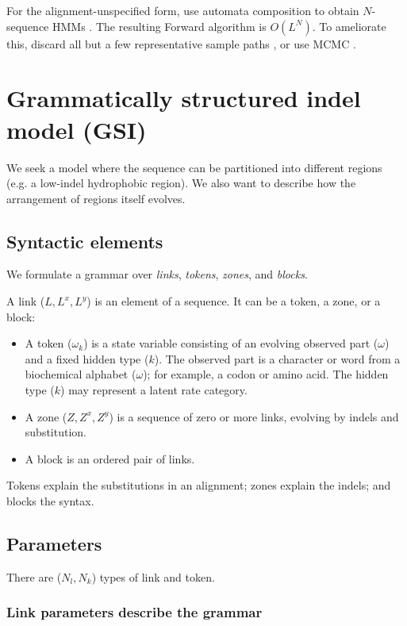 \documentclass{article}
\begin{document}
For the alignment-unspecified form, use automata composition to obtain $N$-sequence HMMs \cite{SilvestreRyanEtAl2020}.
The resulting Forward algorithm is $O(L^N)$.
To ameliorate this, discard all but a few representative sample paths \cite{WestessonEtAl2012},
or use MCMC \cite{RedelingsSuchard2007}.


\section{Grammatically structured indel model (GSI)}

We seek a model where the sequence can be partitioned into different regions (e.g. a low-indel hydrophobic region).
We also want to describe how the arrangement of regions itself evolves.

\subsection{Syntactic elements}

We formulate a grammar over {\em links}, {\em tokens}, {\em zones}, and {\em blocks}.

A link ($L,L^x,L^y$) is an element of a sequence. It can be a token, a zone, or a block:
\begin{itemize}
\item A token ($\omega_k$) is a state variable consisting of an evolving observed part ($\omega$) and a fixed hidden type ($k$).
  The observed part is a character or word from a biochemical alphabet ($\omega$); for example, a codon or amino acid.
  The hidden type ($k$) may represent a latent rate category.
\item A zone ($Z,Z^x,Z^y$) is a sequence of zero or more links, evolving by indels and substitution.
\item A block is an ordered pair of links.
\end{itemize}

Tokens explain the substitutions in an alignment;
zones explain the indels;
and blocks the syntax.

\subsection{Parameters}

There are ($N_l,N_k$) types of link and token.

\subsubsection{Link parameters describe the grammar}
\end{document}
